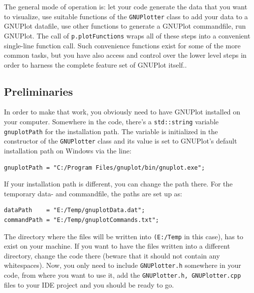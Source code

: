 \documentclass[11pt]{article}
\begin{document}
The general mode of operation is: let your code generate the data that you want to visualize, use suitable functions of the \texttt{GNUPlotter} class to add your data to a GNUPlot datafile, use other functions to generate a GNUPlot commandfile, run GNUPlot. The call of \texttt{p.plotFunctions} wraps all of these steps into a convenient single-line function call. Such convenience functions exist for some of the more common tasks, but you have also access and control over the lower level steps in order to harness the complete feature set of GNUPlot itself..

\subsection{Preliminaries}
In order to make that work, you obviously need to have GNUPlot installed on your computer. Somewhere in the code, there's a \texttt{std::string} variable \texttt{gnuplotPath} for the installation path. The variable is initialized in the constructor of the \texttt{GNUPlotter} class and its value is set to GNUPlot's default installation path on Windows via the line:
\begin{verbatim}
gnuplotPath = "C:/Program Files/gnuplot/bin/gnuplot.exe";
\end{verbatim}
If your installation path is different, you can change the path there. For the temporary data- and commandfile, the paths are set up as:
\begin{verbatim}
dataPath    = "E:/Temp/gnuplotData.dat";
commandPath = "E:/Temp/gnuplotCommands.txt"; 
\end{verbatim}
The directory where the files will be written into \texttt{(E:/Temp} in this case), has to exist on your machine. If you want to have the files written into a different directory, change the code there (beware that it should not contain any whitespaces). Now, you only need to include \texttt{GNUPlotter.h} somewhere in your code, from where you want to use it, add the \texttt{GNUPlotter.h, GNUPlotter.cpp} files to your IDE project and you should be ready to go.
\end{document}
